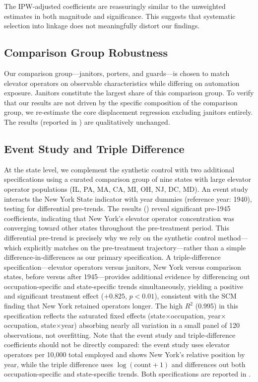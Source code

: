 \documentclass[12pt]{article}
\begin{document}


The IPW-adjusted coefficients are reassuringly similar to the unweighted estimates in both magnitude and significance. This suggests that systematic selection into linkage does not meaningfully distort our findings.

\subsection{Comparison Group Robustness}

Our comparison group---janitors, porters, and guards---is chosen to match elevator operators on observable characteristics while differing on automation exposure. Janitors constitute the largest share of this comparison group. To verify that our results are not driven by the specific composition of the comparison group, we re-estimate the core displacement regression excluding janitors entirely. The results (reported in ) are qualitatively unchanged.

\subsection{Event Study and Triple Difference}

At the state level, we complement the synthetic control with two additional specifications using a curated comparison group of nine states with large elevator operator populations (IL, PA, MA, CA, MI, OH, NJ, DC, MD). An event study interacts the New York State indicator with year dummies (reference year: 1940), testing for differential pre-trends. The results () reveal significant pre-1945 coefficients, indicating that New York's elevator operator concentration was converging toward other states throughout the pre-treatment period. This differential pre-trend is precisely why we rely on the synthetic control method---which explicitly matches on the pre-treatment trajectory---rather than a simple difference-in-differences as our primary specification. A triple-difference specification---elevator operators versus janitors, New York versus comparison states, before versus after 1945---provides additional evidence by differencing out occupation-specific and state-specific trends simultaneously, yielding a positive and significant treatment effect ($+0.825$, $p < 0.01$), consistent with the SCM finding that New York retained operators longer. The high $R^2$ (0.995) in this specification reflects the saturated fixed effects (state$\times$occupation, year$\times$occupation, state$\times$year) absorbing nearly all variation in a small panel of 120 observations, not overfitting. Note that the event study and triple-difference coefficients should not be directly compared: the event study uses elevator operators per 10,000 total employed and shows New York's relative position by year, while the triple difference uses $\log(\text{count} + 1)$ and differences out both occupation-specific and state-specific trends. Both specifications are reported in .
\end{document}
